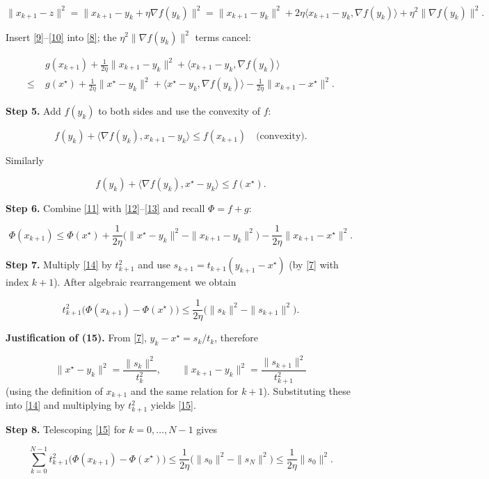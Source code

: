 \documentclass{article}
\begin{document}
\[
\|x_{k+1}-z\|^{2}= \|x_{k+1}-y_k+\eta\nabla f(y_k)\|^{2}
= \|x_{k+1}-y_k\|^{2}+2\eta\langle x_{k+1}-y_k,\nabla f(y_k)\rangle+\eta^{2}\|\nabla f(y_k)\|^{2}.
\tag{10}
\]

Insert \eqref{9}–\eqref{10} into \eqref{8}; the $\eta^{2}\|\nabla f(y_k)\|^{2}$ terms cancel:

\[
\begin{aligned}
& g(x_{k+1})+\frac{1}{2\eta}\|x_{k+1}-y_k\|^{2}
+ \langle x_{k+1}-y_k,\nabla f(y_k)\rangle \\
\le\;& g(x^{\star})+\frac{1}{2\eta}\|x^{\star}-y_k\|^{2}
+ \langle x^{\star}-y_k,\nabla f(y_k)\rangle
-\frac{1}{2\eta}\|x_{k+1}-x^{\star}\|^{2}.
\end{aligned}
\tag{11}
\]

\noindent\textbf{Step 5.}  Add $f(y_k)$ to both sides and use the convexity of $f$:

\[
f(y_k)+\langle \nabla f(y_k),x_{k+1}-y_k\rangle \le f(x_{k+1}) \quad\text{(convexity)}.
\tag{12}
\]

Similarly  

\[
f(y_k)+\langle \nabla f(y_k),x^{\star}-y_k\rangle \le f(x^{\star}).
\tag{13}
\]

\noindent\textbf{Step 6.}  Combine \eqref{11} with \eqref{12}–\eqref{13} and recall $\Phi=\!f+g$:

\[
\Phi(x_{k+1})\le \Phi(x^{\star})
+ \frac{1}{2\eta}\bigl(\|x^{\star}-y_k\|^{2}-\|x_{k+1}-y_k\|^{2}\bigr)
-\frac{1}{2\eta}\|x_{k+1}-x^{\star}\|^{2}.
\tag{14}
\]

\noindent\textbf{Step 7.}  Multiply \eqref{14} by $t_{k+1}^{2}$ and use $s_{k+1}=t_{k+1}(y_{k+1}-x^{\star})$ (by \eqref{7} with index $k+1$).  After algebraic rearrangement we obtain

\[
t_{k+1}^{2}\bigl(\Phi(x_{k+1})-\Phi(x^{\star})\bigr)
\le \frac{1}{2\eta}\bigl(\|s_{k}\|^{2}-\|s_{k+1}\|^{2}\bigr).
\tag{15}
\]

\noindent\textbf{Justification of (15).}  
From \eqref{7}, $y_k-x^{\star}=s_k/t_k$, therefore  

\[
\|x^{\star}-y_k\|^{2}= \frac{\|s_k\|^{2}}{t_k^{2}},\qquad
\|x_{k+1}-y_k\|^{2}= \frac{\|s_{k+1}\|^{2}}{t_{k+1}^{2}}
\]
(using the definition of $x_{k+1}$ and the same relation for $k+1$). Substituting these into \eqref{14} and multiplying by $t_{k+1}^{2}$ yields \eqref{15}. \hfill\qedsymbol

\medskip
\noindent\textbf{Step 8.}  Telescoping \eqref{15} for $k=0,\dots, N-1$ gives  

\[
\sum_{k=0}^{N-1} t_{k+1}^{2}\bigl(\Phi(x_{k+1})-\Phi(x^{\star})\bigr)
\le \frac{1}{2\eta}\bigl(\|s_{0}\|^{2}-\|s_{N}\|^{2}\bigr)
\le \frac{1}{2\eta}\|s_{0}\|^{2}.
\tag{16}
\]
\end{document}
